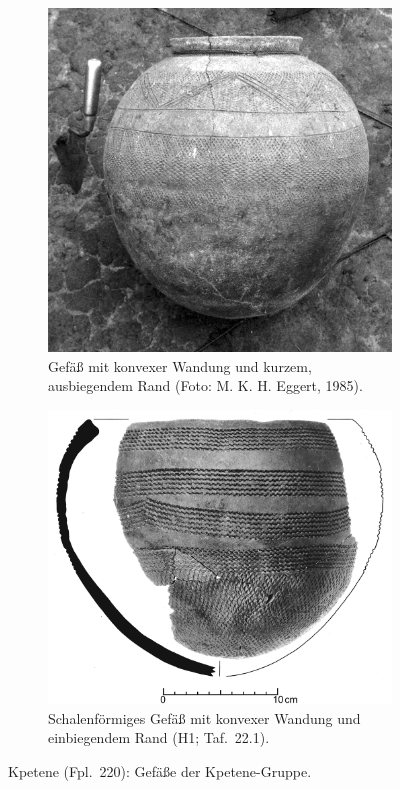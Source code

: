 \begin{figure}[tb]
	\begin{subfigure}[b]{\columnwidth}
		\includegraphics[width=\columnwidth]{fig/KPT85-101_Gef_E85-024-9.jpg}
		\caption{Gefäß mit konvexer Wandung und kurzem, ausbiegendem Rand (Foto: M. K. H. Eggert, 1985).}
		\label{fig:KPT85_Foto-Gef}
	\end{subfigure}\hfill
	\begin{subfigure}[b]{\columnwidth}
		\includegraphics[width=\columnwidth]{fig/KPT85-101-10_M1-2_M.jpg}
		\caption{Schalenförmiges Gefäß mit konvexer Wandung und einbiegendem Rand (H1; Taf.~22.1).}
		\label{fig:KPT85-101-Gef}
	\end{subfigure}
	\caption{Kpetene (Fpl.~220): Gefäße der Kpetene-Gruppe.}
	\label{fig:KPT85_Typvertreter}
\end{figure}

